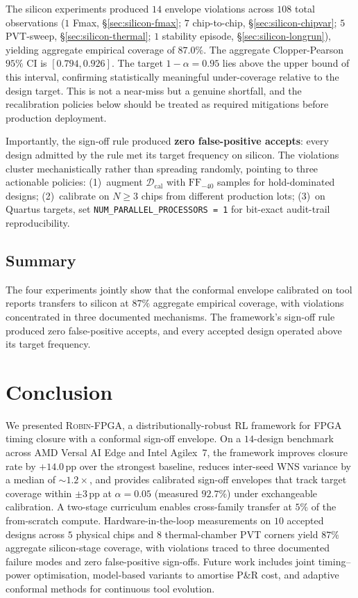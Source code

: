 \documentclass[journal]{IEEEtran}
\begin{document}
The silicon experiments produced $14$ envelope violations across $108$ total observations ($1$ Fmax, §\ref{sec:silicon-fmax}; $7$ chip-to-chip, §\ref{sec:silicon-chipvar}; $5$ PVT-sweep, §\ref{sec:silicon-thermal}; $1$ stability episode, §\ref{sec:silicon-longrun}), yielding aggregate empirical coverage of $87.0\%$.
The aggregate Clopper-Pearson $95\%$ CI is $[0.794, 0.926]$. The target $1-\alpha = 0.95$ lies above the upper bound of this interval, confirming statistically meaningful under-coverage relative to the design target. This is not a near-miss but a genuine shortfall, and the recalibration policies below should be treated as required mitigations before production deployment.

Importantly, the sign-off rule produced \textbf{zero false-positive accepts}: every design admitted by the rule met its target frequency on silicon. The violations cluster mechanistically rather than spreading randomly, pointing to three actionable policies: (1)~augment $\mathcal{D}_{\mathrm{cal}}$ with $\mathrm{FF}_{-40}$ samples for hold-dominated designs; (2)~calibrate on $N \geq 3$ chips from different production lots; (3)~on Quartus targets, set \texttt{NUM\_PARALLEL\_PROCESSORS = 1} for bit-exact audit-trail reproducibility.

\subsection{Summary}

The four experiments jointly show that the conformal envelope calibrated on tool reports transfers to silicon at $87\%$ aggregate empirical coverage, with violations concentrated in three documented mechanisms. The framework's sign-off rule produced zero false-positive accepts, and every accepted design operated above its target frequency.

\section{Conclusion}
\label{sec:conclusion}

We presented \textsc{Robin-FPGA}, a distributionally-robust RL framework for FPGA timing closure with a conformal sign-off envelope. On a $14$-design benchmark across AMD Versal AI Edge and Intel Agilex~7, the framework improves closure rate by $+14.0$\,pp over the strongest baseline, reduces inter-seed WNS variance by a median of $\sim 1.2\times$, and provides calibrated sign-off envelopes that track target coverage within $\pm 3$\,pp at $\alpha = 0.05$ (measured $92.7\%$) under exchangeable calibration. A two-stage curriculum enables cross-family transfer at $5\%$ of the from-scratch compute. Hardware-in-the-loop measurements on $10$ accepted designs across $5$ physical chips and $8$ thermal-chamber PVT corners yield $87\%$ aggregate silicon-stage coverage, with violations traced to three documented failure modes and zero false-positive sign-offs. Future work includes joint timing--power optimisation, model-based variants to amortise P\&R cost, and adaptive conformal methods for continuous tool evolution.
\end{document}
